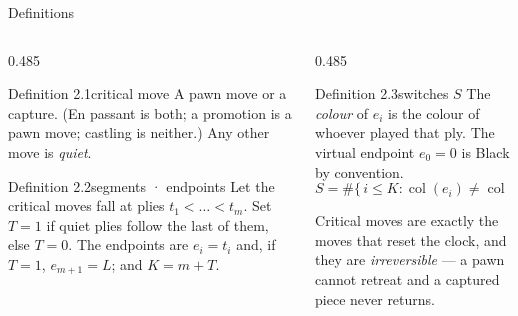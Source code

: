 \documentclass[aspectratio=169,10pt]{beamer}
\begin{document}
\begin{frame}{Definitions}
  \centering
  \par\vspace{0.4cm}
  \begin{columns}[t]
    \begin{column}{0.485\textwidth}
      \begin{lcstate}{Definition 2.1}{critical move}
        {\small A pawn move or a capture. (En passant is both; a promotion
        is a pawn move; castling is neither.) Any other move is
        \emph{quiet}.}
      \end{lcstate}
      \begin{lcstate}{Definition 2.2}{segments · endpoints}
        {\small Let the critical moves fall at plies $t_1<\dots<t_m$. Set
        $T=1$ if quiet plies follow the last of them, else $T=0$. The
        endpoints are $e_i=t_i$ and, if $T=1$, $e_{m+1}=L$; and
        $K=m+T$.}
      \end{lcstate}
    \end{column}
    \begin{column}{0.485\textwidth}
      \begin{lcstate}{Definition 2.3}{switches $S$}
        {\small The \emph{colour} of $e_i$ is the colour of whoever played
        that ply. The virtual endpoint $e_0=0$ is Black by convention.
        \[
          S=\#\{\,i\le K:\operatorname{col}(e_i)\ne
              \operatorname{col}(e_{i-1})\,\}.
        \]}
      \end{lcstate}
      \vspace{0.1cm}
      {\small Critical moves are exactly the moves that reset the clock,
      and they are \emph{irreversible} --- a pawn cannot retreat and a
      captured piece never returns.}
    \end{column}
  \end{columns}
\end{frame}
\end{document}
